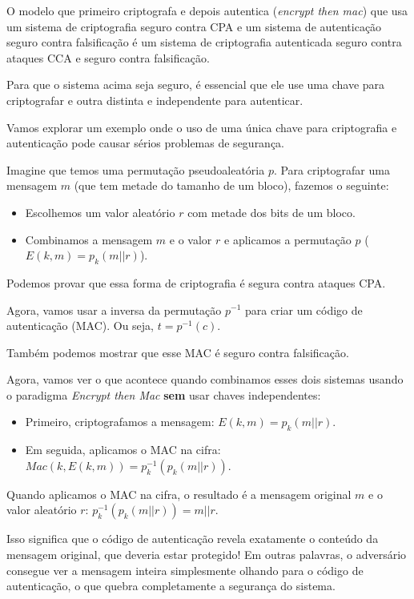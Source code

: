 \begin{theorem}
  O modelo que primeiro criptografa e depois autentica ({\em encrypt then mac}) que usa um sistema de criptografia seguro contra CPA e um sistema de autenticação seguro contra falsificação é um sistema de criptografia autenticada seguro contra ataques CCA e seguro contra falsificação. 
\end{theorem}

Para que o sistema acima seja seguro, é essencial que ele use uma chave para criptografar e outra distinta e independente para autenticar.

Vamos explorar um exemplo onde o uso de uma única chave para criptografia e autenticação pode causar sérios problemas de segurança.

Imagine que temos uma permutação pseudoaleatória $p$.
Para criptografar uma mensagem $m$ (que tem metade do tamanho de um bloco), fazemos o seguinte:
\begin{itemize}
\item Escolhemos um valor aleatório $r$ com metade dos bits de um bloco.
\item Combinamos a mensagem $m$ e o valor $r$ e aplicamos a permutação $p$ ($E(k, m) = p_k(m || r)$).
\end{itemize}

Podemos provar que essa forma de criptografia é segura contra ataques CPA.

Agora, vamos usar a inversa da permutação $p^{-1}$ para criar um código de autenticação (MAC).
Ou seja, $t = p^{-1}(c)$.

Também podemos mostrar que esse MAC é seguro contra falsificação.

Agora, vamos ver o que acontece quando combinamos esses dois sistemas usando o paradigma \textit{Encrypt then Mac} \textbf{sem} usar chaves independentes:

\begin{itemize}
    \item Primeiro, criptografamos a mensagem: $E(k, m) = p_k(m || r)$.
    \item Em seguida, aplicamos o MAC na cifra: $Mac(k, E(k, m)) = p_k^{-1}(p_k(m || r))$.
\end{itemize}

Quando aplicamos o MAC na cifra, o resultado é a mensagem original $m$ e o valor aleatório $r$: $p_k^{-1}(p_k(m || r)) = m || r$.

Isso significa que o código de autenticação revela exatamente o conteúdo da mensagem original, que deveria estar protegido!
Em outras palavras, o adversário consegue ver a mensagem inteira simplesmente olhando para o código de autenticação, o que quebra completamente a segurança do sistema.

